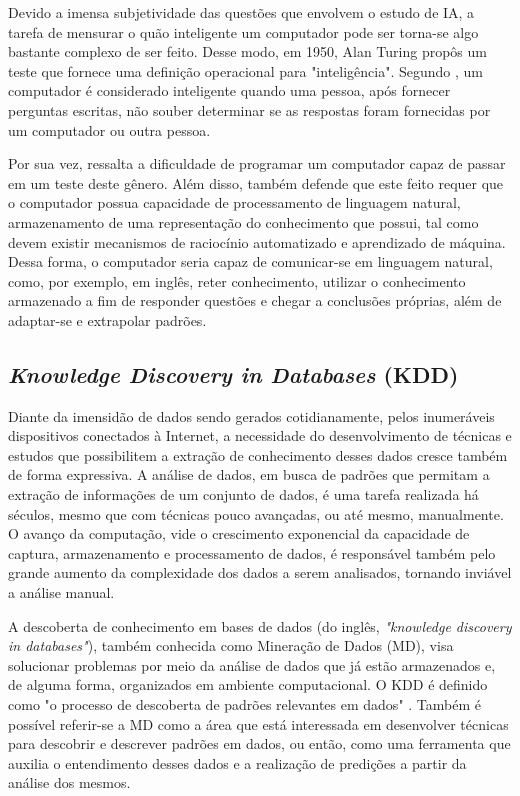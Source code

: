 Devido a imensa subjetividade das questões que envolvem o estudo de IA, a tarefa de mensurar o quão inteligente um computador pode ser torna-se algo bastante complexo de ser feito. Desse modo, em 1950, Alan Turing propôs um teste que fornece uma definição operacional para "inteligência". Segundo , um computador é considerado inteligente quando uma pessoa, após fornecer perguntas escritas, não souber determinar se as respostas foram fornecidas por um computador ou outra pessoa.

Por sua vez,  ressalta a dificuldade de programar um computador capaz de passar em um teste deste gênero. Além disso,  também defende que este feito requer que o computador possua capacidade de processamento de linguagem natural, armazenamento de uma representação do conhecimento que possui, tal como devem existir mecanismos de raciocínio automatizado e aprendizado de máquina. Dessa forma, o computador seria capaz de comunicar-se em linguagem natural, como, por exemplo, em inglês, reter conhecimento, utilizar o conhecimento armazenado a fim de responder questões e chegar a conclusões próprias, além de adaptar-se e extrapolar padrões.

\subsection{\textit{Knowledge Discovery in Databases} (KDD)}

Diante da imensidão de dados sendo gerados cotidianamente, pelos inumeráveis dispositivos conectados à Internet, a necessidade do desenvolvimento de técnicas e estudos que possibilitem a extração de conhecimento desses dados cresce também de forma expressiva. A análise de dados, em busca de padrões que permitam a extração de informações de um conjunto de dados, é uma tarefa realizada há séculos, mesmo que com técnicas pouco avançadas, ou até mesmo, manualmente. O avanço da computação, vide o crescimento exponencial da capacidade de captura, armazenamento e processamento de dados, é responsável também pelo grande aumento da complexidade dos dados a serem analisados, tornando inviável a análise manual. 

A descoberta de conhecimento em bases de dados (do inglês, \textit{"knowledge discovery in databases"}), também conhecida como Mineração de Dados (MD), visa solucionar problemas por meio da análise de dados que já estão armazenados e, de alguma forma, organizados em ambiente computacional. O KDD é definido como "o processo de descoberta de padrões relevantes em dados" \cite{witten2005}. Também é possível referir-se a MD como a área que está interessada em desenvolver técnicas para descobrir e descrever padrões em dados, ou então, como uma ferramenta que auxilia o entendimento desses dados e a realização de predições a partir da análise dos mesmos.

